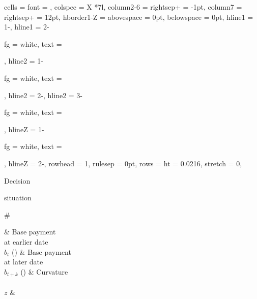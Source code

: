 \documentclass[11pt, a4paper, oneside]{article}
\newlength{\baselinedist}
\newlength{\footnotelinespacing}
\newlength{\fsfootnote}
\let \footnotesizeOrig \footnotesize
\renewcommand{\footnotesize}{\footnotesizeOrig\fontsize{\fsfootnote}{\footnotelinespacing}\selectfont}
\theoremstyle{Plain}
\theoremstyle{Definition}
\theoremstyle{Remark}
\begin{document}
\begin{appendix}
\SetTblrStyle{contfoot-text}{font = \itshape\footnotesize}
\begin{booktabs}[
	caption = {Parameter values used in the time experiment},
	label = {tab:parameter_values_time},
	footsep = 2\belowbottomsep,
	long,
	presep = \smallskipamount,  %
	postsep = \medskipamount,  %
	remark{Note} = {Taken from \url{https://www.econtribute.de/RePEc/ajk/ajkdps/ECONtribute_336_2024.pdf}.},
]{
	cells = {font = \footnotesize},
	colspec = {X *{7}{l}},
	column{2-6} = {rightsep+ = -1pt},
	column{7} = {rightsep+ = 12pt},
	hborder{1-Z} = {abovespace = 0pt, belowspace = 0pt},
	hline{1} = {1}{-}{\heavyrulewidth},
	hline{1} = {2}{-}{fg = white, text = {\rule{0pt}{\belowrulesep}}},
	hline{2} = {1}{-}{fg = white, text = {\rule{0pt}{\aboverulesep}}},
	hline{2} = {2}{-}{\lightrulewidth},
	hline{2} = {3}{-}{fg = white, text = {\rule{0pt}{\belowrulesep}}},
	hline{Z} = {1}{-}{fg = white, text = {\rule{0pt}{\aboverulesep}}},
	hline{Z} = {2}{-}{\heavyrulewidth},
	rowhead = 1,  %
	rulesep = 0pt,
	rows = {ht = 0.0216\textheight},
	stretch = 0,  %
}
	{\strut Decision \\ \strut situation \\ \strut \#} &
	{Base payment \\ at earlier date \\ $b_t$ (\texteuro)} &
	{Base payment \\ at later date \\ $b_{t+k}$ (\texteuro)} &
	{Curvature \\ ~ \\ $z$} &

\end{booktabs}
\end{appendix}
\end{document}
